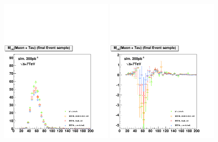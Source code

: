 %
\begin{figure}[t]
\setlength{\unitlength}{1mm}
\begin{center}
\includegraphics*[width=0.49\textwidth, viewport=23 25 525
504]{backgrounds_chapter/figures/plotBgEstFakeRateZtoMuTau_Ztautau_frSimpleMvisible.pdf}
\mbox{\includegraphics*[width=0.49\textwidth, viewport=23 25 525
504]{backgrounds_chapter/figures/plotBgEstFakeRateZtoMuTau_Ztautau_frCDFmVisible.pdf}}


\end{center}
\end{figure}
